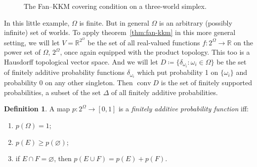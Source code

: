 \documentclass[11pt]{article}
\newcommand{\chg}[1]{{\color{red}#1}}
\theoremstyle{definition}
\newtheorem{definition}[theorem]{Definition}
\theoremstyle{remark}
\begin{document}
\begin{figure}[ht]
\centering
{}
\caption{\chg{The Fan--KKM covering condition on a three-world simplex.}}
\label{fig:kkm}
\end{figure}




In this little example, $\Omega$ is finite. But in general $\Omega$ is an arbitrary (possibly infinite) set of worlds. To apply theorem~\ref{thm:fan-kkm} in this more general setting, we will let $V=\mathbb R^{2^\Omega}$ be the set of all real-valued functions $f:2^\Omega\rightarrow\mathbb R$ on the power set of $\Omega$, $2^\Omega$, once again equipped with the product topology. This too is a Hausdorff topological vector space. And we will let $D\coloneqq\{\delta_{\omega_i}:\omega_i\in\Omega\}$ be the set of finitely additive probability functions $\delta_{\omega_i}$ which put probability 1 on $\{\omega_i\}$ and probability 0 on any other singleton. \chg{Then $\operatorname{conv}D$ is the set of finitely supported probabilities, a subset of the set $\Delta$ of all finitely additive probabilities.}



\begin{definition}\label{def:finitely-additive-probability}
A map $p:2^\Omega\to[0,1]$ is a \emph{finitely additive probability function} iff:
\begin{enumerate}[label=\textup{(FA\arabic*)}]
  \item $p(\Omega)=1$;
  \item $p(E)\geq p(\varnothing)$;
  \item if $E\cap F=\varnothing$, then $p(E\cup F)=p(E)+p(F)$.
\end{enumerate}
\end{definition}
\end{document}
